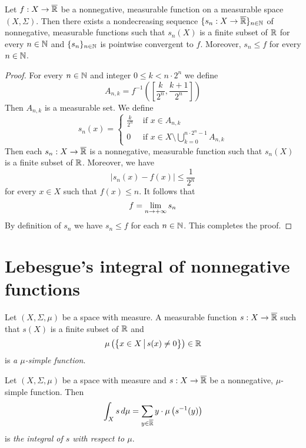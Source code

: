 \begin{proposition}\label{proposition:simple_approximation_for_nonnegative}
Let $f:X\rightarrow \overline{{\mathbb R}}$ be a nonnegative, measurable function on a measurable space $(X,\Sigma)$. Then there exists a nondecreasing sequence $\{s_n:X\rightarrow \overline{{\mathbb R}}\}_{n\in {\mathbb N}}$ of nonnegative, measurable functions such that $s_n(X)$ is a finite subset of ${\mathbb R}$ for every $n\in {\mathbb N}$ and $\{s_n\}_{n\in {\mathbb N}}$ is pointwise convergent to $f$. Moreover, $s_n\leq f$ for every $n\in {\mathbb N}$.
\end{proposition}
\begin{proof}
For every $n\in {\mathbb N}$ and integer $0 \leq k < n\cdot 2^n$ we define 
$$A_{n,k}=f^{-1}\left(\left[\frac{k}{2^n},\frac{k+1}{2^n}\right]\right)$$
Then $A_{n,k}$ is a measurable set. We define
$$s_n(x)=\begin{cases}\frac{k}{2^n}& \mbox{ if } x\in A_{n,k}\\
0& \mbox{ if } x\in X\setminus \bigcup_{k=0}^{n\cdot 2^n-1}A_{n,k}
\end{cases}$$
Then each $s_n:X\rightarrow \overline{{\mathbb R}}$ is a nonnegative, measurable function such that $s_n(X)$ is a finite subset of ${\mathbb R}$. Moreover, we have
$$|s_n(x) - f(x)| \leq \frac{1}{2^n}$$
for every $x \in X$ such that $f(x) \leq n$. It follows that
$$f = \lim_{n\rightarrow +\infty}s_n$$
By definition of $s_n$ we have $s_n \leq f$ for each $n\in {\mathbb N}$. This completes the proof.
\end{proof}

\section{Lebesgue's integral of nonnegative functions}\label{section:lebesgues_integration}

\begin{definition}
Let $(X,\Sigma,\mu)$ be a space with measure. A measurable function $s:X\rightarrow \overline{{\mathbb R}}$ such that $s(X)$ is a finite subset of ${\mathbb R}$ and 
$$\mu\left(\big\{x\in X\,\big|\,s(x)\neq 0\big\}\right) \in {\mathbb R}$$
is \textit{a $\mu$-simple function}.
\end{definition}

\begin{definition}
Let $(X,\Sigma,\mu)$ be a space with measure and $s:X\rightarrow \overline{{\mathbb R}}$ be a nonnegative, $\mu$-simple function. Then
$$\int_Xs\,d\mu = \sum_{y\in \overline{{\mathbb R}}}y\cdot \mu\left(s^{-1}(y)\right)$$
is \textit{the integral of $s$ with respect to $\mu$}.
\end{definition}

